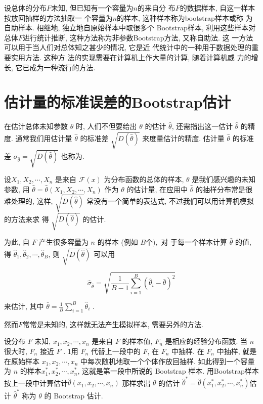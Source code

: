 设总体的分布$F$未知, 但已知有一个容量为$n$的来自分
布$F$的数据样本, 自这一样本按放回抽样的方法抽取一
个容量为$n$的样本, 这种样本称为bootstrap样本或称
为自助样本. 相继地, 独立地自原始样本中取很多个
Bootstrap样本, 利用这些样本对总体$F$进行统计推断, 
这种方法称为非参数Bootstrap方法, 又称自助法. 这
一方法可以用于当人们对总体知之甚少的情况, 它是近
代统计中的一种用于数据处理的重要实用方法. 这种方
法的实现需要在计算机上作大量的计算, 随着计算机威
力的增长, 它已成为一种流行的方法. 

\section{估计量的标准误差的Bootstrap估计}

在估计总体未知参数 $ \theta $ 时, 人们不但要给出 $ \theta $ 的估计 $ \hat{\theta} $, 还需指出这一估计 $ \hat{\theta} $ 的精度. 通常我们用估计量 $ \hat{\theta} $
的标准差 $ \sqrt{D(\hat{\theta})} $ 来度量估计的精度. 估计量 $ \hat{\theta} $ 的标准差 $ \sigma_{\hat{\theta}}=\sqrt{D(\hat{\theta})} $ 也称为. 

设$ {X}_{1}, {X}_{2}, \cdots, X_{n} $ 是来自 $ \mathcal{F}(x) $ 为分布函数的总体的样本, $ \theta $ 是我们感兴趣的未知参数, 用 $ \hat{{\theta}}=\hat{{\theta}}\left({X}_{1}, {X}_{2}, \cdots, {X}_{n}\right) $ 作为 $ \theta $ 的估计量, 在应用中 $ \hat{\theta} $ 的抽样分布常是很难处理的, 这样, $ \sqrt{D(\hat{\theta})} $ 常没有一个简单的表达式, 不过我们可以用计算机模拟的方法来求 得 $ \sqrt{D(\hat{\theta})} $ 的估计. 

为此, 自 $ {F} $ 产生很多容量为 $ {n} $ 的样本 (例如 $ {B 个 ) ,} $ 对 于每一个样本计算 $ \hat{\theta} $ 的值, 得 $ \hat{\theta}_{1}, \hat{\theta}_{2}, \cdots, \hat{\theta}_{B} $, 则 $ \sqrt{D(\hat{\theta})} $ 可以用

$$ \hat{\sigma}_{\hat{\theta}}=\sqrt{\frac{1}{B-1} \sum_{i=1}^{B}\left(\hat{\theta}_{i}-\bar{\theta}\right)^{2}} $$

来估计, 其中 $ \bar{\theta}=\frac{1}{B} \sum_{i=1}^{B} \hat{\theta}_{i} $ . 

然而$F$常常是未知的, 这样就无法产生模拟样本, 需要另外的方法. 

设分布 $ F $ 未知, $ x_{1}, x_{2}, \cdots, x_{n} $ 是来自 $ F $ 的样本值, $ {F}_{n} $ 是相应的经验分布函数. 当 $ n $ 很大时, $ F_{n} $ 接近 $ F $ . 1用 $ F_{n} $ 代替上一段中的 $ F $, 在 $ F_{n} $ 中抽样. 在 $ F_{n} $ 中抽样, 就是在原始样本 $ {x}_{1}, {x}_{2}, \cdots, {x}_{n} $ 中每次随机地取一个个体作放回抽样. 如此得到一个容量为 $ {n} $ 的样本$ {x}_{1}^{*}, {x}_{2}^{*}, \cdots, {x}_{n}^{*} $, 这就是第一段中所说的 Bootstrap 样本. 用Bootstrap样本按上一段中计算估计$ \hat{\theta}\left(x_{1}, x_{2}, \cdots, x_{n}\right) $ 那样求出 $ \theta $ 的估计 $ \hat{\theta}^{*}=\hat{\theta}\left(x_{1}^{*}, x_{2}^{*}, \cdots, x_{n}^{*}\right) $估计 $ \hat{\theta}^{*} $ 称为 $ \theta $ 的 Bootstrap 估计. 



